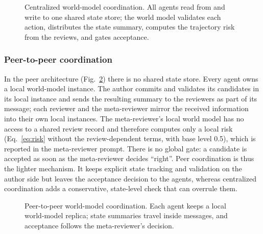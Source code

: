 \begin{figure}[!t]
    \centering
    \resizebox{0.95\textwidth}{!}{}
    \caption{Centralized world-model coordination. All agents read from and write to one shared state store; the world model validates each action, distributes the state summary, computes the trajectory risk from the reviews, and gates acceptance.}
    \label{fig:centralized}
\end{figure}

\subsubsection{Peer-to-peer coordination}
In the peer architecture (Fig.~\ref{fig:peer}) there is no shared state store. Every agent owns a local world-model instance.
The author commits and validates its candidates in its local instance and sends the resulting summary to the reviewers as part of its message; each reviewer and the meta-reviewer mirror the received information into their own local instances.
The meta-reviewer's local world model has no access to a shared review record and therefore computes only a local risk (Eq.~\eqref{eq:risk} without the review-dependent terms, with base level 0.5), which is reported in the meta-reviewer prompt.
There is no global gate: a candidate is accepted as soon as the meta-reviewer decides ``right''.
Peer coordination is thus the lighter mechanism. It keeps explicit state tracking and validation on the author side but leaves the acceptance decision to the agents, whereas centralized coordination adds a conservative, state-level check that can overrule them.

\begin{figure}[!t]
    \centering
    \resizebox{0.95\textwidth}{!}{}
    \caption{Peer-to-peer world-model coordination. Each agent keeps a local world-model replica; state summaries travel inside messages, and acceptance follows the meta-reviewer's decision.}
    \label{fig:peer}
\end{figure}

